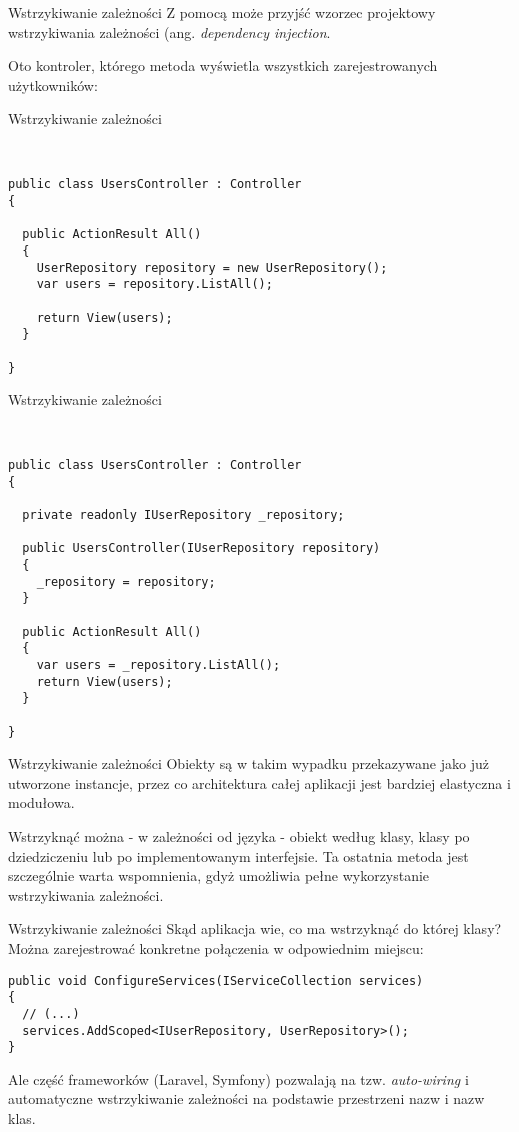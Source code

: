 \begin{frame}{Wstrzykiwanie zależności}
	Z pomocą może przyjść wzorzec projektowy wstrzykiwania zależności (ang. \emph{dependency injection}.
	
	Oto kontroler, którego metoda wyświetla wszystkich zarejestrowanych użytkowników:
\end{frame}

\begin{frame}[fragile]{Wstrzykiwanie zależności}
	\begin{lstlisting}
	
	
public class UsersController : Controller
{

  public ActionResult All()
  {
    UserRepository repository = new UserRepository();
    var users = repository.ListAll();

    return View(users);
  }
  
}
	\end{lstlisting}
\end{frame}

\begin{frame}[fragile]{Wstrzykiwanie zależności}
	\begin{lstlisting}
	
	
public class UsersController : Controller
{
  
  private readonly IUserRepository _repository;

  public UsersController(IUserRepository repository)
  {
    _repository = repository;
  }

  public ActionResult All()
  {
    var users = _repository.ListAll();
    return View(users);
  }

}
	\end{lstlisting}
\end{frame}

\begin{frame}{Wstrzykiwanie zależności}
	Obiekty są w takim wypadku przekazywane jako już utworzone instancje, przez co architektura całej aplikacji jest bardziej elastyczna i modułowa.
	
	Wstrzyknąć można - w zależności od języka - obiekt według klasy, klasy po dziedziczeniu lub po implementowanym interfejsie. Ta ostatnia metoda jest szczególnie warta wspomnienia, gdyż umożliwia pełne wykorzystanie wstrzykiwania zależności.
\end{frame}

\begin{frame}[fragile]{Wstrzykiwanie zależności}
	Skąd aplikacja wie, co ma wstrzyknąć do której klasy? Można zarejestrować konkretne połączenia w odpowiednim miejscu:

	\begin{lstlisting}
public void ConfigureServices(IServiceCollection services)
{
  // (...)
  services.AddScoped<IUserRepository, UserRepository>();
}
	\end{lstlisting}

	Ale część frameworków (Laravel, Symfony) pozwalają na tzw. \emph{auto-wiring} i automatyczne wstrzykiwanie zależności na podstawie przestrzeni nazw i nazw klas.
\end{frame}

